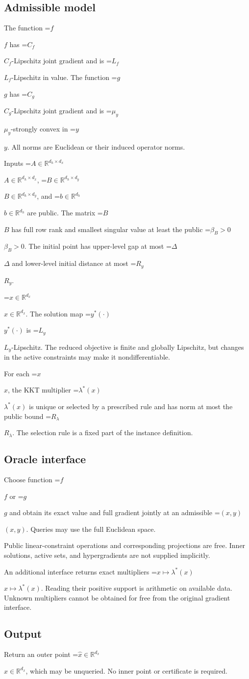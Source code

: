 \documentclass[10pt,a4paper]{article}
\newcommand{\AtlasMath}[1]{\par\begingroup\centering\setbox0=\hbox{$\displaystyle #1$}\ifdim\wd0>1.4\linewidth\typeout{ATLAS WIDE FORMULA: \the\wd0}\fi\ifdim\wd0>\linewidth\resizebox{\linewidth}{!}{\box0}\else\box0\fi\par\endgroup}
\newcommand{\AtlasInlineMath}[1]{\begingroup\setbox0=\hbox{$#1$}\ifdim\wd0>.4\linewidth\endgroup\AtlasMath{#1}\else\endgroup$#1$\fi}
\begin{document}
\subsection{Admissible model}
The function \AtlasInlineMath{f} has \AtlasInlineMath{C_f}-Lipschitz joint gradient and is \AtlasInlineMath{L_f}-Lipschitz in value. The function \AtlasInlineMath{g} has \AtlasInlineMath{C_g}-Lipschitz joint gradient and is \AtlasInlineMath{\mu_y}-strongly convex in \AtlasInlineMath{y}. All norms are Euclidean or their induced operator norms.

Inputs \AtlasInlineMath{A\in\mathbb{R}^{d_h\times d_x}}, \AtlasInlineMath{B\in\mathbb{R}^{d_h\times d_y}}, and \AtlasInlineMath{b\in\mathbb{R}^{d_h}} are public. The matrix \AtlasInlineMath{B} has full row rank and smallest singular value at least the public \AtlasInlineMath{\beta_B>0}. The initial point has upper-level gap at most \AtlasInlineMath{\Delta} and lower-level initial distance at most \AtlasInlineMath{R_y}.

\AtlasInlineMath{x\in\mathbb{R}^{d_x}}. The solution map \AtlasInlineMath{y^*(\cdot)} is \AtlasInlineMath{L_y}-Lipschitz. The reduced objective is finite and globally Lipschitz, but changes in the active constraints may make it nondifferentiable.

For each \AtlasInlineMath{x}, the KKT multiplier \AtlasInlineMath{\lambda^*(x)} is unique or selected by a prescribed rule and has norm at most the public bound \AtlasInlineMath{R_\lambda}. The selection rule is a fixed part of the instance definition.

\subsection{Oracle interface}
Choose function \AtlasInlineMath{f} or \AtlasInlineMath{g} and obtain its exact value and full gradient jointly at an admissible \AtlasInlineMath{(x,y)}. Queries may use the full Euclidean space.

Public linear-constraint operations and corresponding projections are free. Inner solutions, active sets, and hypergradients are not supplied implicitly.

An additional interface returns exact multipliers \AtlasInlineMath{x\mapsto\lambda^*(x)}. Reading their positive support is arithmetic on available data. Unknown multipliers cannot be obtained for free from the original gradient interface.

\subsection{Output}
Return an outer point \AtlasInlineMath{\widehat{x}\in \mathbb{R}^{d_x}}, which may be unqueried. No inner point or certificate is required.
\end{document}
